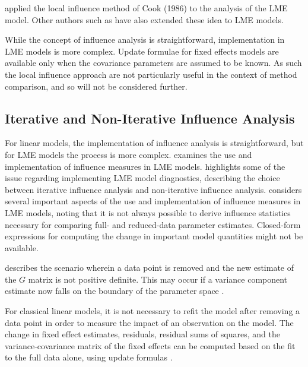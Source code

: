 \documentclass[12pt, a4paper]{report}
\theoremstyle{definition}
\theoremstyle{remark}
\begin{document}
\citet{Beckman} applied the local influence method of Cook (1986) to the analysis of the LME model. Other authors such as \citet{lesaffre1998local} have also extended these idea to LME models. 


While the concept of influence analysis is straightforward, implementation in LME models is more complex. Update formulae for fixed effects models are available only when the covariance parameters are assumed to be known. As such the local influence approach are not particularly useful in the context of method comparison, and so will not be considered further.







\subsection{Iterative and Non-Iterative Influence Analysis}



For linear models, the implementation of influence analysis is straightforward, but for LME models the process is more complex. \citet{schabenberger} examines the use and implementation of
influence measures in LME models. \citet{schabenberger} highlights some of the issue regarding implementing LME model diagnostics, describing  the choice between  iterative influence analysis and  non-iterative influence analysis.
\citet{schabenberger} considers several important aspects of the use and implementation of influence measures in LME models, noting that it is not always possible to
derive influence statistics necessary for comparing full- and reduced-data parameter estimates. Closed-form expressions for computing the change in important model quantities might not be available.

\citet{schabenberger} describes the scenario wherein a data point is removed and the new estimate of the $G$ matrix is not positive definite. This may occur if a variance component
estimate now falls on the boundary of the parameter space \citep{schabenberger}. 

For classical linear models, it is not necessary to refit the model after removing a data point in order to measure the impact of an observation on the model. The change in fixed effect estimates, residuals, residual sums of squares, and the variance-covariance matrix of the fixed effects can be computed based on the fit to the full data alone, using update formulas \citep{sherman, hager1989}.
\end{document}
